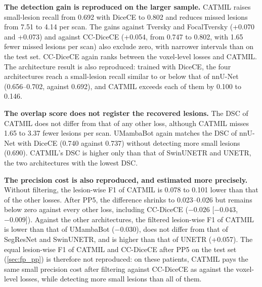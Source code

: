 \textbf{The detection gain is reproduced on the larger sample.} CATMIL
raises small-lesion recall from 0.692 with DiceCE to 0.802 and reduces
missed lesions from 7.51 to 4.14 per scan. The gains against Tversky and
FocalTversky (+0.070 and +0.073) and against CC-DiceCE (+0.054, from 0.747
to 0.802, with 1.65 fewer missed lesions per scan) also exclude zero, with
narrower intervals than on the test set. CC-DiceCE again ranks between the
voxel-level losses and CATMIL. The architecture result is also reproduced:
trained with DiceCE, the four architectures reach a small-lesion recall
similar to or below that of nnU-Net (0.656--0.702, against 0.692), and
CATMIL exceeds each of them by 0.100 to 0.146.

\textbf{The overlap score does not register the recovered lesions.} The DSC
of CATMIL does not differ from that of any other loss, although CATMIL
misses 1.65 to 3.37 fewer lesions per scan. UMambaBot again matches the DSC
of nnU-Net with DiceCE (0.740 against 0.737) without detecting more small
lesions (0.690). CATMIL's DSC is higher only than that of SwinUNETR and
UNETR, the two architectures with the lowest DSC.

\textbf{The precision cost is also reproduced, and estimated more
precisely.} Without filtering, the lesion-wise F1 of CATMIL is 0.078 to
0.101 lower than that of the other losses. After PP5, the difference
shrinks to 0.023--0.026 but remains below zero against every other loss,
including CC-DiceCE ($-0.026$ [$-0.043$, $-0.009$]). Against the other
architectures, the filtered lesion-wise F1 of CATMIL is lower than that of
UMambaBot ($-0.030$), does not differ from that of SegResNet and SwinUNETR,
and is higher than that of UNETR (+0.057). The equal lesion-wise F1 of
CATMIL and CC-DiceCE after PP5 on the test set (\cref{sec:fp_pp}) is
therefore not reproduced: on these patients, CATMIL pays the same small
precision cost after filtering against CC-DiceCE as against the voxel-level
losses, while detecting more small lesions than all of them.
